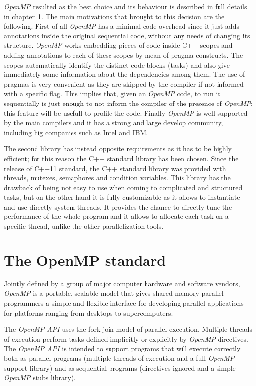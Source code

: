 \documentclass[a4paper,11pt,oneside]{book}
\begin{document}
\emph{OpenMP} resulted as the best choice and its behaviour is described in full details in chapter~\ref{openmp}. The main motivations that brought to this decision are the following. First of all  \emph{OpenMP} has a minimal code overhead since it just adds annotations inside the original sequential code, without any needs of changing its structure.  \emph{OpenMP} works embedding pieces of code inside C++ scopes and adding annotations to each of these scopes by mean of pragma constructs. The scopes automatically identify the distinct code blocks (tasks) and also give immediately some information about the dependencies among them. The use of pragmas is very convenient as they are skipped by the compiler if not informed with a specific flag. This implies that, given an  \emph{OpenMP} code, to run it sequentially is just enough to not inform the compiler of the presence of  \emph{OpenMP}; this feature will be usefull to profile the code. Finally  \emph{OpenMP} is well supported by the main compilers and it has a strong and large develop community, including big companies such as Intel and IBM.  

The second library has instead opposite requirements as it has to be highly efficient; for this reason the C++ standard library has been chosen. Since the release of C++11 standard, the C++ standard library was provided with threads, mutexes, semaphores and condition variables. This library has the drawback of being not easy to use when coming to complicated and structured tasks, but on the other hand it is fully customizable as it allows to instantiate and use directly system threads. It provides the chance to directly tune the performance of the whole program and it allows to allocate each task on a specific thread, unlike the other parallelization tools.

\section{The OpenMP standard}
\label{openmp}

Jointly defined by a group of major computer hardware and software vendors, \emph{OpenMP} is a portable, scalable model that gives shared-memory parallel programmers a simple and flexible interface for developing parallel applications for platforms ranging from desktops to supercomputers.

The \emph{OpenMP API} uses the fork-join model of parallel execution. Multiple threads of execution perform tasks defined implicitly or explicitly by \emph{OpenMP} directives. The \emph{OpenMP API} is intended to support programs that will execute correctly both as parallel programs (multiple threads of execution and a full \emph{OpenMP} support library) and as sequential programs (directives ignored and a simple \emph{OpenMP} stubs library).
\end{document}
